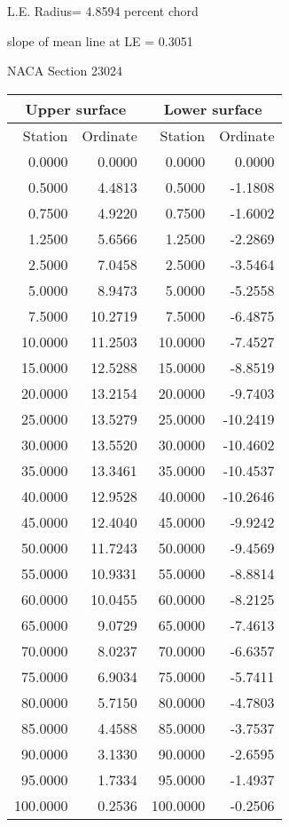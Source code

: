 \documentclass[11pt]{book}
\begin{document}
L.E. Radius=  4.8594 percent chord


 slope of mean line at LE =  0.3051
 \newpage
  \label{s23024}
 \begin{Large}
 NACA Section 23024
 \end{Large}
  
 \vspace{8mm}
 \begin{tabular}{|r|r|r|r|} \hline 
 \multicolumn{2}{|c|}{Upper surface} & \multicolumn{2}{|c|}{Lower surface} \\
 \hline
 Station & Ordinate & Station & Ordinate \\
 \hline
0.0000 & 0.0000 & 0.0000 & 0.0000 \\
0.5000 & 4.4813 & 0.5000 & -1.1808 \\
0.7500 & 4.9220 & 0.7500 & -1.6002 \\
1.2500 & 5.6566 & 1.2500 & -2.2869 \\
2.5000 & 7.0458 & 2.5000 & -3.5464 \\
5.0000 & 8.9473 & 5.0000 & -5.2558 \\
7.5000 & 10.2719 & 7.5000 & -6.4875 \\
10.0000 & 11.2503 & 10.0000 & -7.4527 \\
15.0000 & 12.5288 & 15.0000 & -8.8519 \\
20.0000 & 13.2154 & 20.0000 & -9.7403 \\
25.0000 & 13.5279 & 25.0000 & -10.2419 \\
30.0000 & 13.5520 & 30.0000 & -10.4602 \\
35.0000 & 13.3461 & 35.0000 & -10.4537 \\
40.0000 & 12.9528 & 40.0000 & -10.2646 \\
45.0000 & 12.4040 & 45.0000 & -9.9242 \\
50.0000 & 11.7243 & 50.0000 & -9.4569 \\
55.0000 & 10.9331 & 55.0000 & -8.8814 \\
60.0000 & 10.0455 & 60.0000 & -8.2125 \\
65.0000 & 9.0729 & 65.0000 & -7.4613 \\
70.0000 & 8.0237 & 70.0000 & -6.6357 \\
75.0000 & 6.9034 & 75.0000 & -5.7411 \\
80.0000 & 5.7150 & 80.0000 & -4.7803 \\
85.0000 & 4.4588 & 85.0000 & -3.7537 \\
90.0000 & 3.1330 & 90.0000 & -2.6595 \\
95.0000 & 1.7334 & 95.0000 & -1.4937 \\
100.0000 & 0.2536 & 100.0000 & -0.2506 \\
 \hline 
 \end{tabular}
\end{document}
